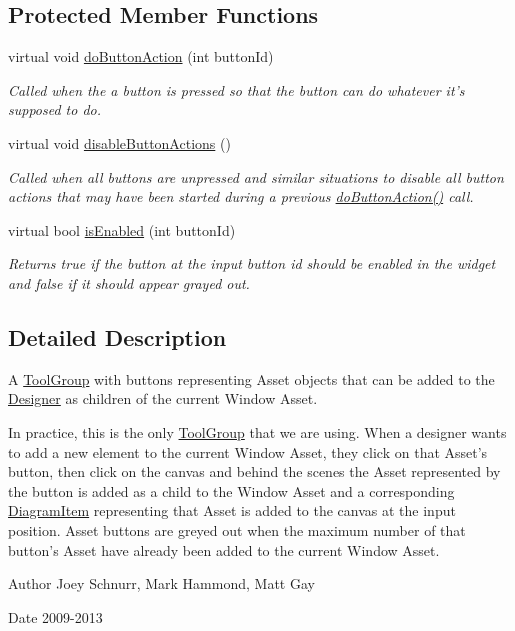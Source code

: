 \subsection*{Protected Member Functions}
\begin{DoxyCompactItemize}
\item 
\hypertarget{class_asset_tool_group_a5d66a2e3ecdaddadbe1968e66e25d0af}{virtual void \hyperlink{class_asset_tool_group_a5d66a2e3ecdaddadbe1968e66e25d0af}{do\-Button\-Action} (int button\-Id)}\label{class_asset_tool_group_a5d66a2e3ecdaddadbe1968e66e25d0af}

\begin{DoxyCompactList}\small\item\em Called when the a button is pressed so that the button can do whatever it's supposed to do. \end{DoxyCompactList}\item 
virtual void \hyperlink{class_asset_tool_group_a40d2cbb367b31985978ea998bd6b6c34}{disable\-Button\-Actions} ()
\begin{DoxyCompactList}\small\item\em Called when all buttons are unpressed and similar situations to disable all button actions that may have been started during a previous \hyperlink{class_asset_tool_group_a5d66a2e3ecdaddadbe1968e66e25d0af}{do\-Button\-Action()} call. \end{DoxyCompactList}\item 
virtual bool \hyperlink{class_asset_tool_group_ab2ec8039e421e6be073fdfa9d4da7328}{is\-Enabled} (int button\-Id)
\begin{DoxyCompactList}\small\item\em Returns true if the button at the input button id should be enabled in the widget and false if it should appear grayed out. \end{DoxyCompactList}\end{DoxyCompactItemize}


\subsection{Detailed Description}
A \hyperlink{class_tool_group}{Tool\-Group} with buttons representing Asset objects that can be added to the \hyperlink{class_designer}{Designer} as children of the current Window Asset. 

In practice, this is the only \hyperlink{class_tool_group}{Tool\-Group} that we are using. When a designer wants to add a new element to the current Window Asset, they click on that Asset's button, then click on the canvas and behind the scenes the Asset represented by the button is added as a child to the Window Asset and a corresponding \hyperlink{class_diagram_item}{Diagram\-Item} representing that Asset is added to the canvas at the input position. Asset buttons are greyed out when the maximum number of that button's Asset have already been added to the current Window Asset. \begin{DoxyAuthor}{Author}
Joey Schnurr, Mark Hammond, Matt Gay 
\end{DoxyAuthor}
\begin{DoxyDate}{Date}
2009-\/2013 
\end{DoxyDate}


